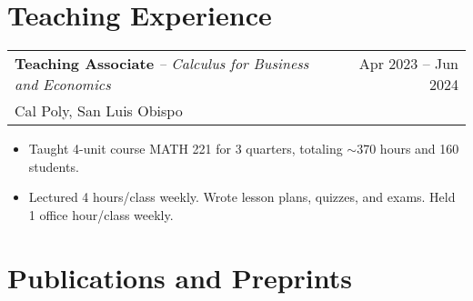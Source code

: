 \documentclass[a4paper,11pt]{article}
\makeatletter
\newenvironment{jobcustomlong}[4]
    {
    \begin{tabularx}{\linewidth}{@{}l X r@{}}
    \textbf{#1} \textit{#2} & \hfill &  #3 \\[-2.5pt]
    \textcolor{black!55!white}{\small #4} \\[2.5pt]
    \end{tabularx}
    \begin{minipage}[t]{\linewidth}
    \begin{itemize}[nosep,after=\strut, leftmargin=1.75em, itemsep=1pt,label={\small$\bullet$}]
    }
    {
    \end{itemize} \vspace{.325em}
    \end{minipage}   
    }
\newcommand{\calpoly}{\textcolor{black!55!white}{Cal Poly, San Luis Obispo}}
\makeatother
\begin{document}
\section{Teaching Experience}

\begin{jobcustomlong}{Teaching Associate}{-- Calculus for Business and Economics}{Apr 2023 -- Jun 2024}{\calpoly}
    \item Taught 4-unit course MATH 221 for 3 quarters, totaling $\sim$370 hours and 160 students.
    \item Lectured 4 hours/class weekly. Wrote lesson plans, quizzes, and exams. Held 1 office hour/class weekly.
\end{jobcustomlong}
\vspace{-1.5em}


\section{Publications and Preprints}\label{sec:publications}
\begin{refsection}
\nocite{*}
\printbibliography[heading=none]
\end{refsection}
\end{document}

